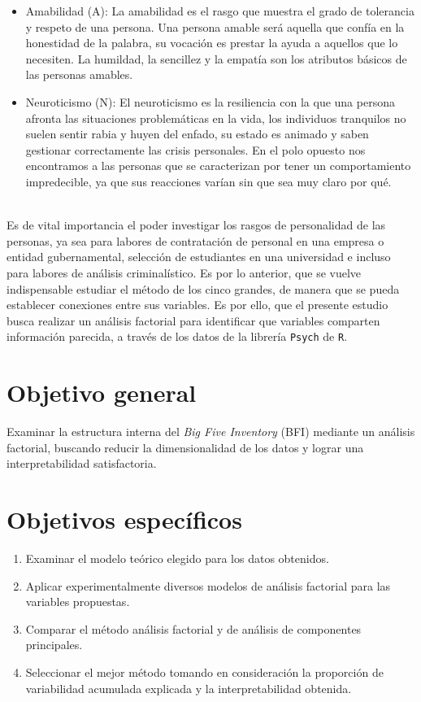 \documentclass{report}
\begin{document}
\begin{itemize}
\item Amabilidad (A): La amabilidad es el rasgo que muestra el grado de tolerancia y respeto de una persona. Una persona amable será aquella que confía en la honestidad de la palabra, su vocación es prestar la ayuda a aquellos que lo necesiten. La humildad, la sencillez y la empatía son los atributos básicos de las personas amables.\\

\item Neuroticismo (N): El neuroticismo es la resiliencia con la que una persona afronta las situaciones problemáticas en la vida, los individuos tranquilos no suelen sentir rabia y huyen del enfado, su estado es animado y saben gestionar correctamente las crisis personales. En el polo opuesto nos encontramos a las personas que se caracterizan por tener un comportamiento impredecible, ya que sus reacciones varían sin que sea muy claro por qué.
\end{itemize}\\

Es de vital importancia el poder investigar los rasgos de personalidad de las personas, ya sea para labores de contratación de personal en una empresa o entidad gubernamental, selección de estudiantes en una universidad e incluso para labores de análisis criminalístico. Es por lo anterior, que se vuelve indispensable estudiar el método de los cinco grandes, de manera que se pueda establecer conexiones entre sus variables. Es por ello, que el presente estudio busca realizar un análisis factorial para identificar que variables comparten información parecida, a través de los datos de la librería \texttt{Psych} de \texttt{R}.\\

\newpage
\section{Objetivo general}
Examinar la estructura interna del \textit{Big Five Inventory} (BFI) mediante un análisis factorial, buscando reducir la dimensionalidad de los datos y lograr una interpretabilidad satisfactoria.
\section{Objetivos específicos}
\begin{enumerate}
    \item Examinar el modelo teórico elegido para los datos obtenidos.
    \item Aplicar experimentalmente diversos modelos de análisis factorial para las variables propuestas.
    \item Comparar el método análisis factorial y de análisis de componentes principales.
    \item Seleccionar el mejor método tomando en consideración la proporción de variabilidad acumulada explicada y la interpretabilidad obtenida.
\end{enumerate}
\end{document}
